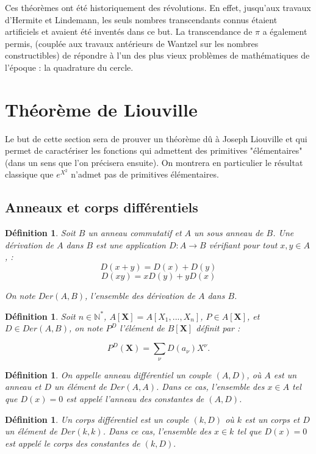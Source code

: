 \documentclass[12pt,a4paper]{report}
\newtheorem{defn}[thm]{\bf D\'efinition}
\begin{document}
Ces théorèmes ont été historiquement des révolutions. En effet, jusqu'aux travaux d'Hermite et Lindemann, les seuls nombres transcendants connus étaient artificiels et avaient été inventés dans ce but. La transcendance de $\pi$ a également permis, (couplée aux travaux antérieurs de Wantzel sur les nombres constructibles) de répondre à l'un des plus vieux problèmes de mathématiques de l'époque : la quadrature du cercle.

\section{Théorème de Liouville}
Le but de cette section sera de prouver un théorème dû à Joseph Liouville et qui permet de caractériser les fonctions qui admettent des primitives "élémentaires" (dans un sens que l'on précisera ensuite). On montrera en particulier le résultat classique que $e^{X^{2}}$ n'admet pas de primitives élémentaires.  
\subsection{Anneaux et corps différentiels}

\begin{defn}\rm
Soit $B$ un anneau commutatif et $A$ un sous anneau de $B$. Une dérivation de $A$ dans $B$ est une application $D :A\rightarrow B$ vérifiant pour tout $x,y \in A$, : 
$$D(x+y)=D(x)+D(y)$$
$$D(xy)=xD(y)+yD(x)$$

On note $Der(A,B)$, l'ensemble des dérivation de $A$ dans $B$. 

\end{defn}

\begin{defn}\rm
Soit $n\in \mathbb{N}^{*}$, $A[\textbf{X}]=A[X_1,...,X_n]$, $P\in A[\textbf{X}]$, et $D\in Der(A,B)$, on note $P^{D}$ l'élément de $B[\textbf{X}]$ définit par : 

$$P^{D}(\textbf{X})=\sum_{\nu}D(a_{\nu}) X^{\nu}.$$

\end{defn}


\begin{defn}\rm
On appelle anneau différentiel un couple $(A,D)$, où $A$ est un anneau et $D$ un élément de $Der(A,A)$. Dans ce cas, l'ensemble des $x\in A$ tel que $D(x)=0$ est appelé l'anneau des constantes de $(A,D)$. 

\end{defn}

\begin{defn}\rm
Un corps différentiel est un couple $(k,D)$ où $k$ est un corps et $D$ un élément de $Der(k,k)$. Dans ce cas, l'ensemble des $x \in k$ tel que $D(x)=0$ est appelé le corps des constantes de $(k,D).$

\end{defn}
\end{document}
